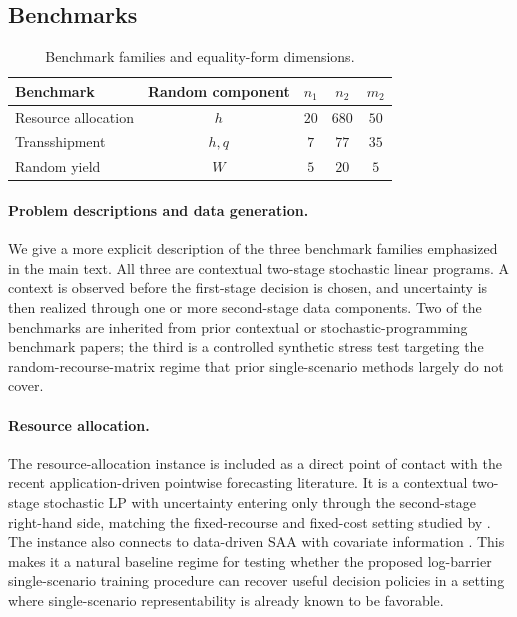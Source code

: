 \documentclass{article}
\newcommand{\1}{\mathbf{1}}
\theoremstyle{plain}
\theoremstyle{definition}
\theoremstyle{remark}
\begin{document}
\subsection{Benchmarks}

\begin{table}[h]
\centering
\small
\begin{tabular}{lcccc}
\toprule
Benchmark & Random component & $n_1$ & $n_2$ & $m_2$ \\
\midrule
Resource allocation & $h$ & $20$ & $680$ & $50$ \\
Transshipment & $h,q$ & $7$ & $77$ & $35$ \\
Random yield & $W$ & $5$ & $20$ & $5$ \\
\bottomrule
\end{tabular}
\caption{Benchmark families and equality-form dimensions.}
\label{tab:app-benchmark-dimensions}
\end{table}

\paragraph{Problem descriptions and data generation.}
We give a more explicit description of the three benchmark families emphasized in the main text. All three are contextual two-stage stochastic linear programs. A context is observed before the first-stage decision is chosen, and uncertainty is then realized through one or more second-stage data components. Two of the benchmarks are inherited from prior contextual or stochastic-programming benchmark papers; the third is a controlled synthetic stress test targeting the random-recourse-matrix regime that prior single-scenario methods largely do not cover.

\paragraph{Resource allocation.}
The resource-allocation instance is included as a direct point of contact with the recent application-driven pointwise forecasting literature. It is a contextual two-stage stochastic LP with uncertainty entering only through the second-stage right-hand side, matching the fixed-recourse and fixed-cost setting studied by \citet{homemdemello2024forecasting}. The instance also connects to data-driven SAA with covariate information \citep{kannan2025datadriven}. This makes it a natural baseline regime for testing whether the proposed log-barrier single-scenario training procedure can recover useful decision policies in a setting where single-scenario representability is already known to be favorable.
\end{document}
